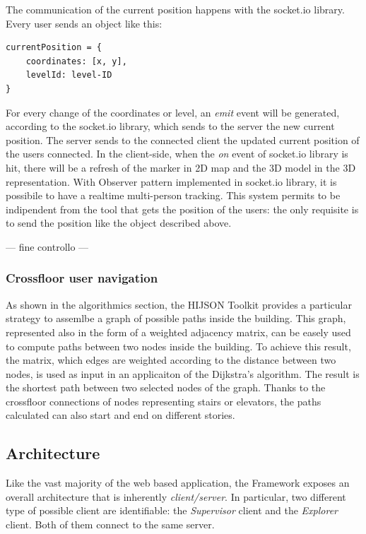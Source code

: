 \documentclass{sig-alternate}
\begin{document}
The communication of the current position happens with the socket.io
library. Every user sends an object like this:

\begin{verbatim}
currentPosition = {
    coordinates: [x, y],
    levelId: level-ID  
}
\end{verbatim}

For every change of the coordinates or level, an \emph{emit} event will
be generated, according to the socket.io library, which sends to the
server the new current position. The server sends to the connected
client the updated current position of the users connected. In the
client-side, when the \emph{on} event of socket.io library is hit, there
will be a refresh of the marker in 2D map and the 3D model in the 3D
representation. With Observer pattern implemented in socket.io library,
it is possibile to have a realtime multi-person tracking. This system
permits to be indipendent from the tool that gets the position of the
users: the only requisite is to send the position like the object
described above.

--- fine controllo ---

\subsubsection{Crossfloor user navigation}\label{crossfloor-user-navigation}

As shown in the algorithmics section, the HIJSON Toolkit provides a particular strategy 
to assemlbe a graph of possible paths inside the building. This graph, represented also 
in the form of a weighted adjacency matrix, can be easely used to compute paths between 
two nodes inside the building. To achieve this result, the matrix, which edges are weighted 
according to the distance between two nodes, is used as input in an applicaiton of the 
Dijkstra's algorithm. The result is the shortest path between two selected nodes of the graph. 
Thanks to the crossfloor connections of nodes representing stairs or elevators, the paths
 calculated can also start and end on different stories. 

\subsection{Architecture}\label{architecture}

Like the vast majority of the web based application, the Framework
exposes an overall architecture that is inherently \emph{client/server}.
In particular, two different type of possible client are identifiable:
the \emph{Supervisor} client and the \emph{Explorer} client. Both of
them connect to the same server.
\end{document}
